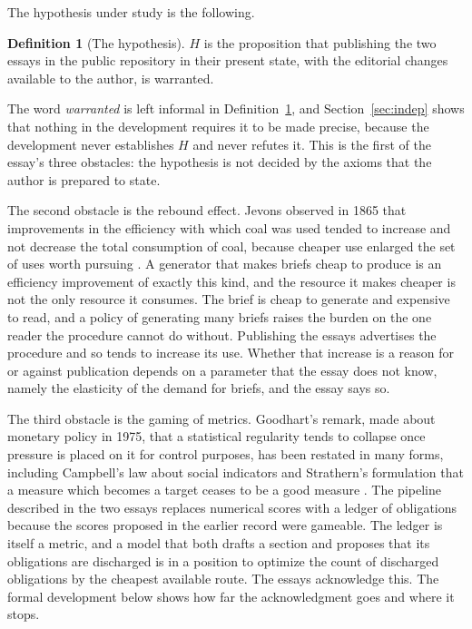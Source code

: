 \documentclass[11pt]{article}
\theoremstyle{plain}
\theoremstyle{definition}
\newtheorem{definition}[theorem]{Definition}
\theoremstyle{remark}
\newcommand{\Hyp}{H}
\begin{document}
The hypothesis under study is the following.

\begin{definition}[The hypothesis]\label{def:H}
$\Hyp$ is the proposition that publishing the two essays in the public repository in their present state, with the editorial changes available to the author, is warranted.
\end{definition}

The word \emph{warranted} is left informal in Definition~\ref{def:H}, and Section~\ref{sec:indep} shows that nothing in the development requires it to be made precise, because the development never establishes $\Hyp$ and never refutes it. This is the first of the essay's three obstacles: the hypothesis is not decided by the axioms that the author is prepared to state.

The second obstacle is the rebound effect. Jevons observed in 1865 that improvements in the efficiency with which coal was used tended to increase and not decrease the total consumption of coal, because cheaper use enlarged the set of uses worth pursuing \cite{jevons1865}. A generator that makes briefs cheap to produce is an efficiency improvement of exactly this kind, and the resource it makes cheaper is not the only resource it consumes. The brief is cheap to generate and expensive to read, and a policy of generating many briefs raises the burden on the one reader the procedure cannot do without. Publishing the essays advertises the procedure and so tends to increase its use. Whether that increase is a reason for or against publication depends on a parameter that the essay does not know, namely the elasticity of the demand for briefs, and the essay says so.

The third obstacle is the gaming of metrics. Goodhart's remark, made about monetary policy in 1975, that a statistical regularity tends to collapse once pressure is placed on it for control purposes, has been restated in many forms, including Campbell's law about social indicators and Strathern's formulation that a measure which becomes a target ceases to be a good measure \cite{goodhart1975,campbell1979,strathern1997}. The pipeline described in the two essays replaces numerical scores with a ledger of obligations because the scores proposed in the earlier record were gameable. The ledger is itself a metric, and a model that both drafts a section and proposes that its obligations are discharged is in a position to optimize the count of discharged obligations by the cheapest available route. The essays acknowledge this. The formal development below shows how far the acknowledgment goes and where it stops.
\end{document}
